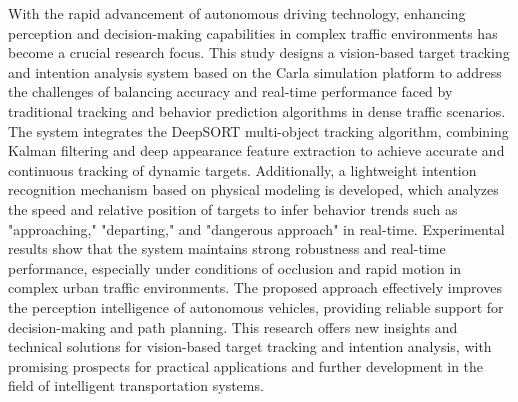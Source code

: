 \begin{abstracten}

    With the rapid advancement of autonomous driving technology, enhancing perception and decision-making capabilities in complex traffic environments has become a crucial research focus. This study designs a vision-based target tracking and intention analysis system based on the Carla simulation platform to address the challenges of balancing accuracy and real-time performance faced by traditional tracking and behavior prediction algorithms in dense traffic scenarios. The system integrates the DeepSORT multi-object tracking algorithm, combining Kalman filtering and deep appearance feature extraction to achieve accurate and continuous tracking of dynamic targets. Additionally, a lightweight intention recognition mechanism based on physical modeling is developed, which analyzes the speed and relative position of targets to infer behavior trends such as "approaching," "departing," and "dangerous approach" in real-time. Experimental results show that the system maintains strong robustness and real-time performance, especially under conditions of occlusion and rapid motion in complex urban traffic environments. The proposed approach effectively improves the perception intelligence of autonomous vehicles, providing reliable support for decision-making and path planning. This research offers new insights and technical solutions for vision-based target tracking and intention analysis, with promising prospects for practical applications and further development in the field of intelligent transportation systems.

\end{abstracten}
